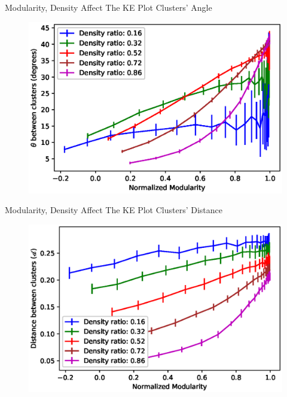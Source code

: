 \documentclass[aspectratio=169,11pt]{beamer}
\begin{document}
\begin{frame}{Modularity, Density Affect The KE Plot Clusters' Angle}
	\begin{figure}
		\centering
		\includegraphics[scale=0.7]{theta_ba.eps}
	\end{figure}
\end{frame}

\begin{frame}{Modularity, Density Affect The KE Plot Clusters' Distance}
	\begin{figure}
		\centering
		\includegraphics[scale=0.7]{distance_ba.eps}
	\end{figure}
\end{frame}
\end{document}
